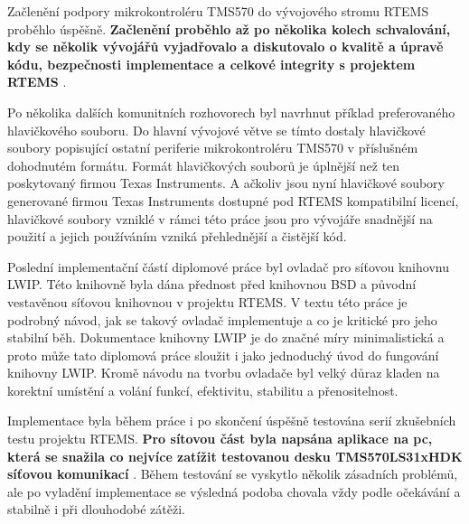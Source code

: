 Začlenění podpory mikrokontroléru TMS570 do vývojového stromu RTEMS proběhlo úspěšně.
{\bf Začlenění proběhlo až po několika kolech schvalování, kdy se několik vývojářů vyjadřovalo a diskutovalo o kvalitě a úpravě kódu, bezpečnosti implementace a celkové integrity s projektem RTEMS }.

Po několika dalších komunitních rozhovorech byl navrhnut příklad preferovaného hlavičkového souboru.
Do hlavní vývojové větve se tímto dostaly hlavičkové soubory popisující ostatní periferie mikrokontroléru TMS570 v příslušném dohodnutém formátu.
Formát hlavičkových souborů je úplnější než ten poskytovaný firmou Texas Instruments.
A ačkoliv jsou nyní hlavičkové soubory generované firmou Texas Instruments dostupné pod RTEMS kompatibilní licencí, hlavičkové soubory vzniklé v rámci této práce jsou pro vývojáře snadnější na použití a jejich používáním vzniká přehlednější a čistější kód. 

Poslední implementační částí diplomové práce byl ovladač pro síťovou knihovnu LWIP.
Této knihovně byla dána přednost před knihovnou BSD a původní vestavěnou síťovou knihovnou v projektu RTEMS.
V textu této práce je podrobný návod, jak se takový ovladač implementuje a co je kritické pro jeho stabilní běh.
Dokumentace knihovny LWIP je do značné míry minimalistická a proto může tato diplomová práce sloužit i jako jednoduchý úvod do fungování knihovny LWIP.
Kromě návodu na tvorbu ovladače byl velký důraz kladen na korektní umístění a volání funkcí, efektivitu, stabilitu a přenositelnost.

Implementace byla během práce i po skončení úspěšně testována serií zkušebních testu projektu RTEMS.
{\bf Pro sítovou část byla napsána aplikace na pc, která se snažila co nejvíce zatížit testovanou desku TMS570LS31xHDK síťovou komunikací }.
Během testování se vyskytlo několik zásadních problémů, ale po vyladění implementace se výsledná podoba chovala vždy podle očekávání a stabilně i při dlouhodobé zátěži.




\bye
\grid

